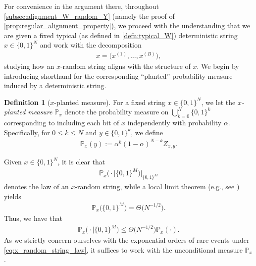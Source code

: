 \documentclass[11pt]{amsart}
\numberwithin{equation}{section}
\numberwithin{equation}{section}
\newcommand{\1}{\mathbbm{1}}
\newcommand{\Prob}{\mathbb{P}}
\theoremstyle{definition}
\newtheorem{definition}[theorem]{Definition}
\newenvironment{remark}
  {\pushQED{\qed}\renewcommand{\qedsymbol}{$\triangle$}\remarkx}
  {\popQED\endremarkx}
\begin{document}
For convenience in the argument there, throughout \cref{subsec:alignment_W_random_Y} (namely the proof of \cref{prop:regular_alignment_property}), we proceed with the understanding that we are given a fixed typical (as defined in \cref{defn:typical_W}) deterministic string $x \in \{0,1\}^N$ and work with the decomposition
\begin{align} \label{eq:X_decomp}
    x = \big( x^{(1)}, \dots, x^{(B)} \big),
\end{align}
studying how an $x$-random string aligns with the structure of $x$. We begin by introducing shorthand for the corresponding ``planted'' probability measure induced by a deterministic string.
\begin{definition}[$x$-planted measure] \label{defn:planted_prob_msr}
    For a fixed string $x \in \{0,1\}^N$, we let the \emph{$x$-planted measure} $\Prob_x$ denote the probability measure on $\bigcup_{k=0}^{N} \{0,1\}^k$ corresponding to including each bit of $x$ independently with probability $\alpha$. Specifically, for $0 \leq k \leq N$ and $y \in \{0,1\}^k$, we define
    \begin{align*}
        \Prob_x\!\left( y \right) := \alpha^k (1-\alpha)^{N-k} Z_{x,y}.
    \end{align*}
\end{definition}

\begin{remark} \label{rmk:V_random_msr}
    Given $x \in \{0,1\}^N$, it is clear that
    \begin{align} \label{eq:x_random_string_law}
        \Prob_x\big( \cdot \mid \{0,1\}^M \big) |_{\{0,1\}^M}
    \end{align}
    denotes the law of an $x$-random string, while a local limit theorem (e.g., see \cite[Theorem 3.5.3]{durrett2019probability}) yields 
    \begin{align*}
        \Prob_x\big( \{0,1\}^M \big) = \Theta\big( N^{-1/2} \big).
    \end{align*}
    Thus, we have that
    \begin{align} \label{eq:V_random_msr_bayes}
        \Prob_x\big( \cdot \mid \{0,1\}^M \big) \leq \Theta\big( N^{-1/2} \big)\Prob_x\!\left( \cdot \right).
    \end{align}
    As we strictly concern ourselves with the exponential orders of rare events under \eqref{eq:x_random_string_law}, it suffices to work with the unconditional measure $\Prob_x$.
\end{remark}
\end{document}
